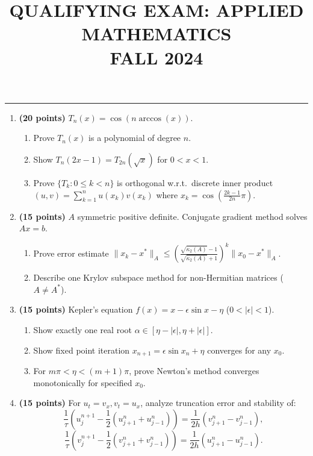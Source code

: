 \documentclass[11pt,a4paper]{article}
\title{\textbf{QUALIFYING EXAM: APPLIED MATHEMATICS}\\[0.5em]\Large FALL 2024}
\date{}
\author{}
\begin{document}
\maketitle
\vspace{-3em}

\noindent\rule{\linewidth}{0.4pt}

\begin{enumerate}[label=\textbf{(\arabic*)}]
    \item \textbf{(20 points)} $T_n(x) = \cos(n \arccos(x))$.
    \begin{enumerate}[label=(\roman*)]
        \item Prove $T_n(x)$ is a polynomial of degree $n$.
        \item Show $T_n(2x - 1) = T_{2n}(\sqrt{x})$ for $0 < x < 1$.
        \item Prove $\{T_k : 0 \le k < n\}$ is orthogonal w.r.t.\ discrete inner product $(u, v) = \sum_{k=1}^n u(x_k)v(x_k)$ where $x_k = \cos(\frac{2k-1}{2n}\pi)$.
    \end{enumerate}

    \item \textbf{(15 points)} $A$ symmetric positive definite. Conjugate gradient method solves $Ax = b$.
    \begin{enumerate}[label=(\roman*)]
        \item Prove error estimate $\|x_k - x^*\|_A \le \left(\frac{\sqrt{\kappa_2(A)} - 1}{\sqrt{\kappa_2(A)} + 1}\right)^k \|x_0 - x^*\|_A$.
        \item Describe one Krylov subspace method for non-Hermitian matrices ($A \neq A^*$).
    \end{enumerate}

    \item \textbf{(15 points)} Kepler's equation $f(x) = x - \epsilon \sin x - \eta$ ($0 < |\epsilon| < 1$).
    \begin{enumerate}[label=(\roman*)]
        \item Show exactly one real root $\alpha \in [\eta - |\epsilon|, \eta + |\epsilon|]$.
        \item Show fixed point iteration $x_{n+1} = \epsilon \sin x_n + \eta$ converges for any $x_0$.
        \item For $m\pi < \eta < (m+1)\pi$, prove Newton's method converges monotonically for specified $x_0$.
    \end{enumerate}

    \item \textbf{(15 points)} For $u_t = v_x, v_t = u_x$, analyze truncation error and stability of:
    \[
    \frac{1}{\tau} \left(u_j^{n+1} - \frac{1}{2}(u_{j+1}^n + u_{j-1}^n)\right) = \frac{1}{2h}(v_{j+1}^n - v_{j-1}^n),
    \]
    \[
    \frac{1}{\tau} \left(v_j^{n+1} - \frac{1}{2}(v_{j+1}^n + v_{j-1}^n)\right) = \frac{1}{2h}(u_{j+1}^n - u_{j-1}^n).
    \]


\end{enumerate}
\end{document}
